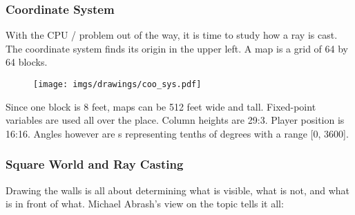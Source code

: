 \subsubsection{Coordinate System}
With the CPU / problem out of the way, it is time to study how a ray is cast. The coordinate system finds its origin in the upper left. A map is a grid of 64 by 64 blocks. 
\begin{figure}[H]
  \centering
 \texttt{[image: imgs/drawings/coo\_sys.pdf]}
\end{figure}
\par
Since one block is 8 feet, maps can be 512 feet wide and tall. Fixed-point variables are used all over the place. Column heights are 29:3. Player position is 16:16. Angles however are s representing tenths of degrees with a range [0, 3600].

















\subsubsection{Square World and Ray Casting}
Drawing the walls is all about determining what is visible, what is not, and what is in front of what. Michael Abrash's view on the topic tells it all:\\
\vspace{-10pt}

